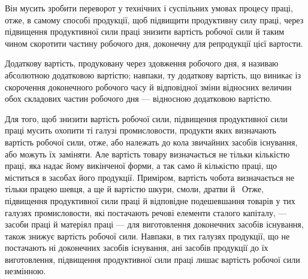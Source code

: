\parcont{}  %
Він мусить зробити переворот у технічних і суспільних умовах
процесу праці, отже, в самому способі продукції, щоб підвищити
продуктивну силу праці, через підвищення продуктивної сили
праці знизити вартість робочої сили й таким чином скоротити
частину робочого дня, доконечну для репродукції цієї вартости.

Додаткову вартість, продуковану через здовження робочого
дня, я називаю абсолютною додатковою вартістю; навпаки, ту
додаткову вартість, що виникає із скорочення доконечного робочого
часу й відповідної зміни відносних величин обох складових
частин робочого дня — відносною додатковою вартістю.

Для того, щоб знизити вартість робочої сили, підвищення
продуктивної сили праці мусить охопити ті галузі промисловости,
продукти яких визначають вартість робочої сили, отже, або
належать до кола звичайних засобів існування, або можуть їх
заміняти. Але вартість товару визначається не тільки кількістю
праці, яка надає йому викінченої форми, а так само й кількістю
праці, що міститься в засобах його продукції. Приміром, вартість
чобота визначається не тільки працею шевця, а ще й вартістю
шкури, смоли, дратви й~ Отже, підвищення продуктивної
сили праці й відповідне подешевшання товарів у тих галузях
промисловости, які постачають речові елементи сталого капіталу, —
засоби праці й матеріял праці — для виготовлення доконечних
засобів існування, також знижує вартість робочої сили. Навпаки,
в тих галузях продукції, що не постачають ні доконечних засобів
існування, ані засобів продукції до їх виготовлення, підвищення
продуктивної сили праці лишає вартість робочої сили незмінною.

